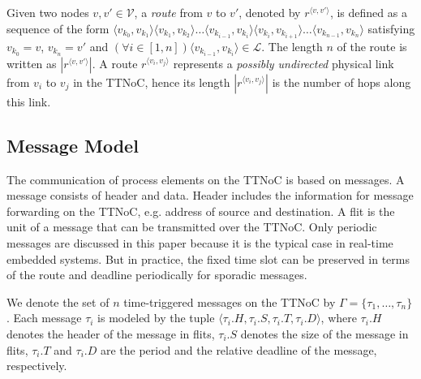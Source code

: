 \documentclass[journal]{IEEEtran}
\newcommand{\calV}{\mathcal{V}}
\newcommand{\calL}{\mathcal{L}}
\newcommand{\route}[3]{#1^{\langle #2,#3\rangle}}
\begin{document}
Given two nodes $v,v'\in\calV$, a \emph{route} from $v$ to $v'$,
denoted by $\route{r}{v}{v'}$, is defined as a sequence of the form
$\langle v_{k_0},v_{k_1}\rangle\langle
v_{k_1},v_{k_2}\rangle\ldots\langle v_{k_{i-1}},v_{k_i}\rangle\langle
v_{k_i},v_{k_{i+1}}\rangle\ldots \langle v_{k_{n-1}},v_{k_n}\rangle$
satisfying $v_{k_0}=v$, $v_{k_n}=v'$ and $(\forall i\in [1,n])\langle
v_{k_{i-1}},v_{k_i}\rangle \in\calL$. The length $n$ of the route is
written as $|\route{r}{v}{v'}|$. A route $\route{r}{v_i}{v_j}$
represents a \emph{possibly undirected} physical link from $v_i$ to
$v_j$ in the TTNoC, hence its length $|\route{r}{v_i}{v_j}|$ is the
number of hops along this link.



\subsection{Message Model}
The communication of process elements on the TTNoC is based on messages. 
A message consists of header and data.
Header includes the information for message forwarding on the TTNoC, 
e.g. address of source and destination.
A flit is the unit of a message that can be transmitted over the TTNoC.
Only periodic messages are discussed in this paper because it is the typical case in real-time embedded systems. 
But in practice, the fixed time slot can be preserved in terms of the route and
deadline periodically for sporadic messages. 

We denote the set of $n$ time-triggered messages on the TTNoC by
$\Gamma = \{\tau_{1},\dots,\tau_{n}\}$. Each message $\tau_{i}$ is
modeled by the tuple $\langle \tau_{i}.H,\tau_{i}.S, \tau_{i}.T,
\tau_{i}.D\rangle$, 
where $\tau_{i}.H$ denotes the header of the message in flits,
$\tau_{i}.S$ denotes the size of the message in flits, 
$\tau_{i}.T$ and $\tau_{i}.D$ are the period and the relative deadline of the message, respectively.
 
\end{document}
